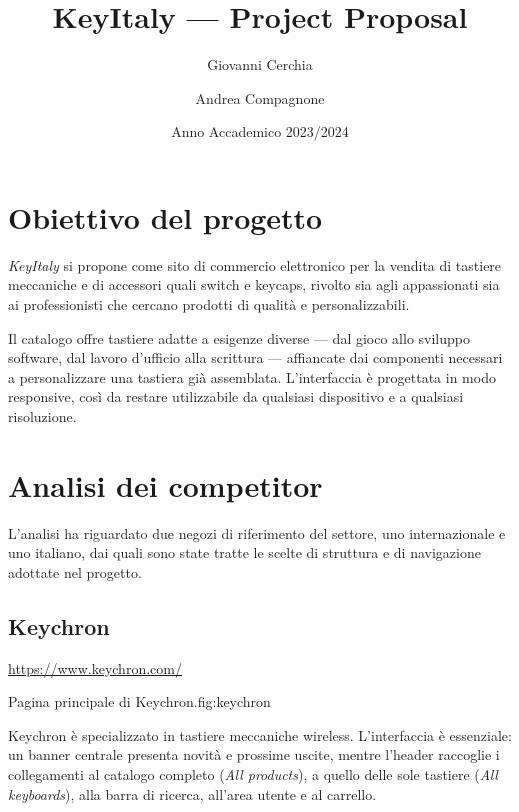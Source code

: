 \documentclass[11pt,a4paper]{article}
\title{KeyItaly --- Project Proposal}
\author{Giovanni Cerchia \and Andrea Compagnone}
\date{Anno Accademico 2023/2024}
\begin{document}
\hypersetup{pageanchor=false}

\tableofcontents
\clearpage
{}
\hypersetup{pageanchor=true}

\section{Obiettivo del progetto}

\emph{KeyItaly} si propone come sito di commercio elettronico per la vendita di
tastiere meccaniche e di accessori quali switch e keycaps, rivolto sia agli
appassionati sia ai professionisti che cercano prodotti di qualità e
personalizzabili.

Il catalogo offre tastiere adatte a esigenze diverse --- dal gioco allo sviluppo
software, dal lavoro d'ufficio alla scrittura --- affiancate dai componenti
necessari a personalizzare una tastiera già assemblata. L'interfaccia è
progettata in modo responsive, così da restare utilizzabile da qualsiasi
dispositivo e a qualsiasi risoluzione.

\section{Analisi dei competitor}

L'analisi ha riguardato due negozi di riferimento del settore, uno
internazionale e uno italiano, dai quali sono state tratte le scelte di
struttura e di navigazione adottate nel progetto.

\subsection{Keychron}

\noindent\url{https://www.keychron.com/}

  {Pagina principale di Keychron.}{fig:keychron}

Keychron è specializzato in tastiere meccaniche wireless. L'interfaccia è
essenziale: un banner centrale presenta novità e prossime uscite, mentre
l'header raccoglie i collegamenti al catalogo completo (\emph{All products}), a
quello delle sole tastiere (\emph{All keyboards}), alla barra di ricerca,
all'area utente e al carrello.
\end{document}
